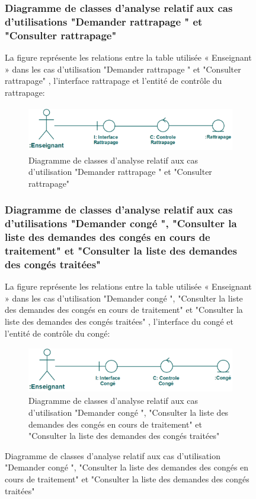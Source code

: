 \documentclass[12 pt]{report}
\begin{document}
\begin{figure}[h]
\begin{center}
\subsubsection{Diagramme de classes d’analyse relatif aux cas d’utilisations "Demander rattrapage " et "Consulter rattrapage" }
La figure  représente les relations entre la table utilisée « Enseignant » dans les cas d’utilisation "Demander rattrapage " et "Consulter rattrapage" , l’interface  rattrapage et  l'entité de  contrôle du rattrapage:
\begin{figure}[h]
\begin{center}
\includegraphics[width= 12cm , height =2cm]{cdc.png}
\caption{Diagramme de classes d’analyse relatif aux cas d’utilisation "Demander rattrapage " et "Consulter rattrapage" }
\end{center}
\end{figure} 
\subsubsection{Diagramme de classes d’analyse relatif aux cas d’utilisations "Demander congé ", "Consulter la liste des demandes des congés en cours de traitement" et "Consulter la liste des demandes des congés traitées"}
La figure  représente les relations entre la table utilisée « Enseignant » dans les cas d’utilisation "Demander congé ", "Consulter la liste des demandes des congés en cours de traitement" et "Consulter la liste des demandes des congés traitées" , l’interface  du congé et  l'entité de  contrôle du congé:
\begin{figure}[h]
\begin{center}
\includegraphics[width= 12cm , height =2cm]{cdr.png}
\caption{Diagramme de classes d’analyse relatif aux cas d’utilisation "Demander congé ", "Consulter la liste des demandes des congés en cours de traitement" et "Consulter la liste des demandes des congés traitées"}
\end{center}
\end{figure}

\end{center}
\end{figure}
\end{document}
